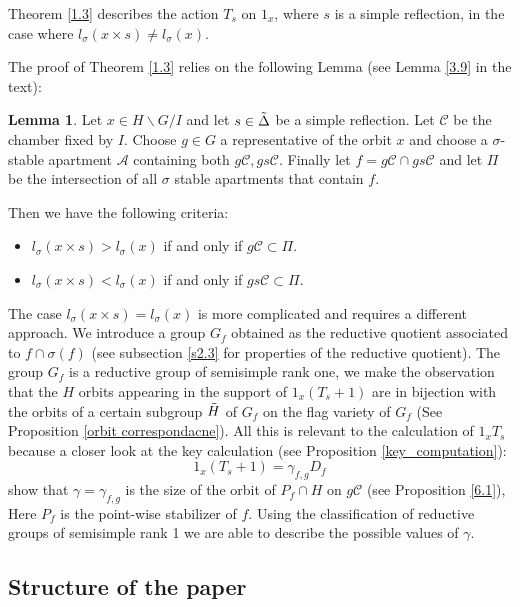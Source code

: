 \documentclass[12pt]{article}
\newcommand{\A}{\mathcal{A}}
\newcommand{\C}{\mathcal{C}}
\newcommand{\<}{\langle}
\renewcommand{\>}{\rangle}
\theoremstyle{plain}
\theoremstyle{definition}
\newtheorem{lemma}[theorem]{Lemma}
\begin{document}
Theorem \ref{1.3} describes the action $T_{s}$ on $1_{x}$, where $s$ is a simple reflection, in the case where $l_\sigma(x\times s)\neq l_\sigma(x)$. 

The proof of Theorem \ref{1.3} relies on the following Lemma (see Lemma \ref{3.9} in the text):


\begin{lemma}
Let $x\in H\backslash G/I$ and let $s\in \Tilde{\Delta}$ be a simple reflection.
Let $\C$ be the chamber fixed by $I$. Choose $g\in G$ a representative of the orbit $x$ and choose a $\sigma$-stable apartment $\A$ containing both  $g\C,gs\C$.
Finally let $f=g\C\cap gs\C$ and let $\Pi$ be the intersection of all $\sigma$ stable apartments that contain $f$.

Then we have the following criteria:
\begin{itemize}

\item $l_\sigma(x \times s)>l_\sigma(x)$ if and only if $g\C\subset \Pi$.
    \item $l_\sigma(x\times s)<l_\sigma(x)$ if and only if $gs\C\subset \Pi$.
\end{itemize}
\end{lemma}

The case $l_\sigma(x\times s)=l_\sigma(x)$ is more complicated and requires a different approach.
We introduce a group $G_{f}$ obtained as the reductive quotient associated to $f\cap \sigma(f)$ (see subsection \ref{s2.3} for properties of the reductive quotient). The group $G_{f}$ is a reductive group of semisimple rank one, we make the observation that the $H$ orbits appearing in the support of $1_x(T_s+1)$ are in bijection with the orbits of a certain subgroup $\Tilde{H}$ of $G_f$ on the flag variety of $G_{f}$ (See Proposition \ref{orbit correspondacne}). All this is relevant to the calculation of $1_{x}T_{s}$ because a closer look at the key calculation (see Proposition \ref{key_computation}): $$1_{x}(T_{s}+1)=\gamma_{f,g}D_{f}$$
show that $\gamma=\gamma_{f,g}$ is the size of the orbit of $P_{f} \cap H$ on $g\C$ (see Proposition \ref{6.1}), Here $P_f$ is the point-wise stabilizer of $f$. Using the classification of reductive groups of semisimple rank 1 we are able to describe the possible values of $\gamma$.   



\subsection{Structure of the paper}
\end{document}
